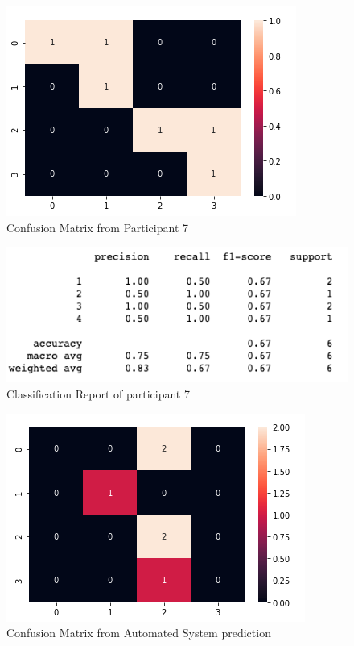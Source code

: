 \begin{figure}[!htp]
    \includegraphics[width=\textwidth]{Images/p7.png}
    \caption{Confusion Matrix from Participant 7}
    \label{fig:f11}
\end{figure}

\begin{figure}[!htp]
    \includegraphics[width=\textwidth]{Images/p7r.png}
    \caption{Classification Report of participant 7}
    \label{fig:f11}
\end{figure}

\pagebreak

\begin{figure}[!htp]
    \includegraphics[width=\textwidth]{Images/a7.png}
    \caption{Confusion Matrix from Automated System prediction}
    \label{fig:f11}
\end{figure}

